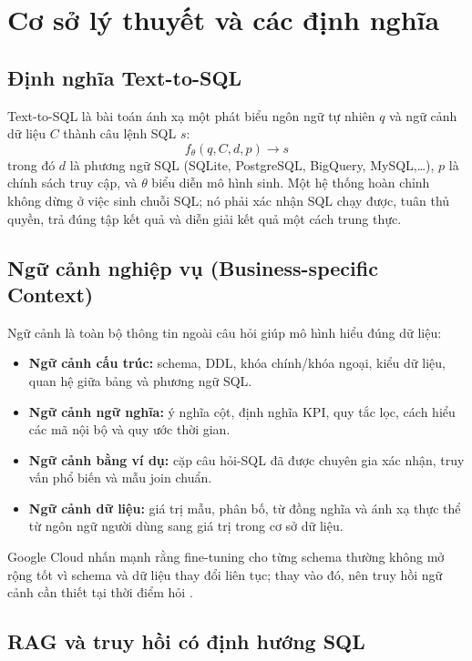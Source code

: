 \documentclass[12pt,a4paper]{article}
\begin{document}
\section{Cơ sở lý thuyết và các định nghĩa}

\subsection{Định nghĩa Text-to-SQL}

Text-to-SQL là bài toán ánh xạ một phát biểu ngôn ngữ tự nhiên
$q$ và ngữ cảnh dữ liệu $C$ thành câu lệnh SQL $s$:
\[
 f_{\theta}(q,C,d,p) \longrightarrow s
\]
trong đó $d$ là phương ngữ SQL (SQLite, PostgreSQL, BigQuery, MySQL,\ldots),
$p$ là chính sách truy cập, và $\theta$ biểu diễn mô hình sinh. Một hệ thống
hoàn chỉnh không dừng ở việc sinh chuỗi SQL; nó phải xác nhận SQL chạy được,
tuân thủ quyền, trả đúng tập kết quả và diễn giải kết quả một cách trung
thực.

\subsection{Ngữ cảnh nghiệp vụ (Business-specific Context)}

Ngữ cảnh là toàn bộ thông tin ngoài câu hỏi giúp mô hình hiểu đúng dữ liệu:

\begin{itemize}
  \item \textbf{Ngữ cảnh cấu trúc:} schema, DDL, khóa chính/khóa ngoại, kiểu dữ
  liệu, quan hệ giữa bảng và phương ngữ SQL.
  \item \textbf{Ngữ cảnh ngữ nghĩa:} ý nghĩa cột, định nghĩa KPI, quy tắc lọc,
  cách hiểu các mã nội bộ và quy ước thời gian.
  \item \textbf{Ngữ cảnh bằng ví dụ:} cặp câu hỏi-SQL đã được chuyên gia xác
  nhận, truy vấn phổ biến và mẫu join chuẩn.
  \item \textbf{Ngữ cảnh dữ liệu:} giá trị mẫu, phân bố, từ đồng nghĩa và ánh
  xạ thực thể từ ngôn ngữ người dùng sang giá trị trong cơ sở dữ liệu.
\end{itemize}

Google Cloud nhấn mạnh rằng fine-tuning cho từng schema thường không mở rộng
tốt vì schema và dữ liệu thay đổi liên tục; thay vào đó, nên truy hồi ngữ
cảnh cần thiết tại thời điểm hỏi \cite{google2025}.

\subsection{RAG và truy hồi có định hướng SQL}
\end{document}
